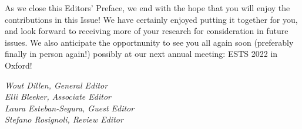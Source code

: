 \begin{preface}
As we close this Editors' Preface, we end with the hope that you will enjoy the contributions in this Issue! 
We have certainly enjoyed putting it together for you, and look forward to receiving more of your research for consideration in future issues. 
We also anticipate the opportnunity to see you all again soon (preferably finally in person again!) possibly at our next annual meeting: ESTS 2022 in Oxford!

\begin{flushright}
\emph{
Wout Dillen, General Editor\\
Elli Bleeker, Associate Editor\\
Laura Esteban-Segura, Guest Editor\\
Stefano Rosignoli, Review Editor
}
\end{flushright}

\end{preface}
